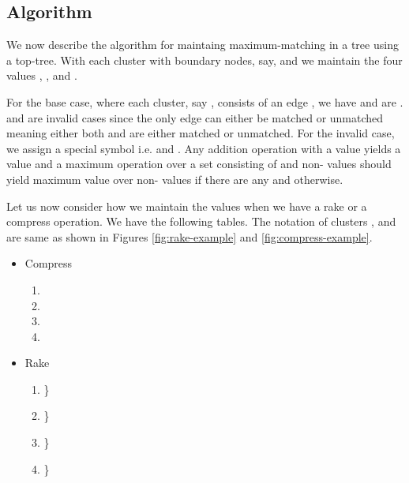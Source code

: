 \documentclass[a4paper,12pt]{article}
\begin{document}
\subsection{Algorithm}
We now describe the algorithm for maintaing maximum-matching in a tree using a top-tree. With each cluster  with boundary nodes, say,  and  we maintain the four values , ,  and .

For the base case, where each cluster, say , consists of an edge , we have  and  are .  and  are invalid cases since the only edge  can either be matched or unmatched meaning either both  and  are either matched or unmatched. For the invalid case, we assign a special symbol  i.e.  and . Any addition operation with a  value yields a  value and a maximum operation over a set consisting of  and non- values should yield maximum value over non- values if there are any and  otherwise.

Let us now consider how we maintain the values  when we have a rake or a compress operation. We have the following tables. The notation of clusters ,  and  are same as shown in Figures \ref{fig:rake-example} and \ref{fig:compress-example}.

\begin{itemize}
\item Compress
\begin{enumerate}\item 
\item 
\item 
\item 
\end{enumerate}


\item Rake
\begin{enumerate}
\item \}
\item \}
\item \}
\item \}
\end{enumerate}
\end{itemize}
\end{document}
